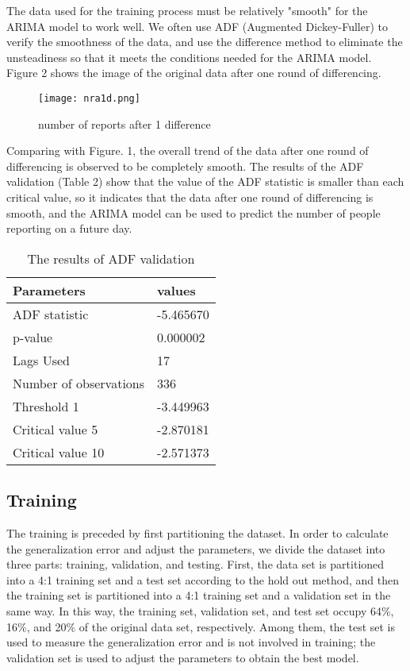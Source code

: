 \documentclass[12pt]{article}  %
\begin{document}
The data used for the training process must be relatively "smooth" for the ARIMA model to work well. We often use ADF (Augmented Dickey-Fuller) to verify the smoothness of the data, and use the difference method to eliminate the unsteadiness so that it meets the conditions needed for the ARIMA model. Figure 2 shows the image of the original data after one round of differencing.


\begin{figure}[H]
	\centering
	\texttt{[image: nra1d.png]}
	\caption{number of reports after 1 difference}
	\label{img2}
\end{figure}

Comparing with Figure. 1, the overall trend of the data after one round of differencing is observed to be completely smooth. The results of the ADF validation (Table 2) show that the value of the ADF statistic is smaller than each critical value, so it indicates that the data after one round of differencing is smooth, and the ARIMA model can be used to predict the number of people reporting on a future day.
\begin{table}[!ht]
    \centering
    \begin{tabular}{|l|l|}
    \hline
        \textbf{Parameters} & \textbf{values} \\ \hline
        ADF statistic & -5.465670 \\ \hline
        p-value & 0.000002 \\ \hline
        Lags Used & 17 \\ \hline
        Number of observations & 336 \\ \hline
        Threshold 1 & -3.449963 \\ \hline
        Critical value 5 & -2.870181 \\ \hline
        Critical value 10 & -2.571373 \\ \hline
    \end{tabular}
	\caption{The results of ADF validation}
\end{table}


\subsection{Training}
The training is preceded by first partitioning the dataset. In order to calculate the generalization error and adjust the parameters, we divide the dataset into three parts: training, validation, and testing. First, the data set is partitioned into a 4:1 training set and a test set according to the hold out method, and then the training set is partitioned into a 4:1 training set and a validation set in the same way. In this way, the training set, validation set, and test set occupy 64\%, 16\%, and 20\% of the original data set, respectively. Among them, the test set is used to measure the generalization error and is not involved in training; the validation set is used to adjust the parameters to obtain the best model.
\end{document}
